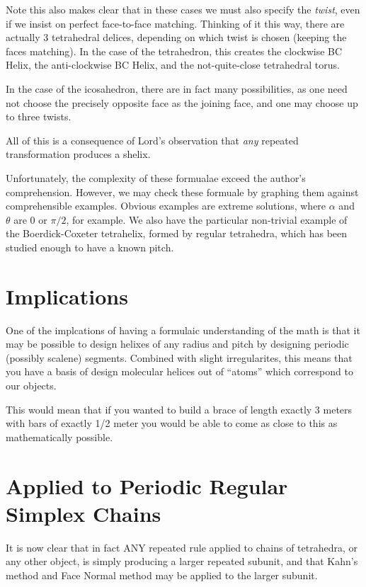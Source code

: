 \documentclass[11pt]{article}
\begin{document}
{Note this also makes clear that in these cases we must also specify the {\em twist},
even if we insist on perfect face-to-face matching. Thinking of it this
way, there are actually 3 tetrahedral delices, depending on which twist
is chosen (keeping the faces matching). In the case of the tetrahedron,
this creates the clockwise BC Helix, the anti-clockwise BC Helix, and the
not-quite-close tetrahedral torus.

In the case of the icosahedron, there are in fact many possibilities,
as one need not choose the precisely opposite face as the joining face, and
one may choose up to three twists.

All of this is a consequence of Lord's observation that {\em any}
repeated transformation produces a shelix.

Unfortunately, the complexity of these formualae exceed the author's comprehension.
However, we may check these formuale by graphing them against comprehensible
examples. Obvious examples are extreme solutions, where $\alpha$  and $\theta$ are
$0$ or $\pi/2$, for example. We also have the particular non-trivial example
of the Boerdick-Coxeter tetrahelix, formed by regular tetrahedra, which has
been studied enough to have a known pitch.

\section{Implications}

One of the implcations of having a formulaic understanding of the math
is that it may be possible to design helixes
of any radius and pitch by designing periodic (possibly scalene) segments. Combined with slight
irregularites, this means that you have a basis of design molecular helices
out of ``atoms'' which correspond to our objects.

This would mean that if you wanted to build a brace of length exactly 3 meters
with bars of exactly 1/2 meter you would be able to come as close to this
as mathematically possible.


\section{Applied to Periodic Regular Simplex Chains}

It is now clear that in fact ANY repeated rule applied to chains of tetrahedra, or any other object,
is simply producing a larger repeated subunit, and that Kahn's method and Face Normal method
may be applied to the larger subunit.

}
\end{document}
